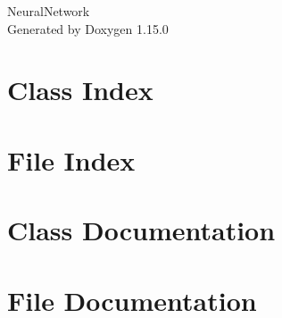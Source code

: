 \documentclass[twoside]{book}
\newcommand{\+}{\discretionary{\mbox{\scriptsize$\hookleftarrow$}}{}{}}
\newcommand{\clearemptydoublepage}{%
    \newpage{\pagestyle{empty}\cleardoublepage}%
  }
\begin{document}
  \raggedbottom
    \hypersetup{pageanchor=false,
                bookmarksnumbered=true,
                pdfencoding=unicode
               }
  \begin{titlepage}
  \vspace*{7cm}
  \begin{center}%
  {\Large Neural\+Network}\\
  \vspace*{1cm}
  {\large Generated by Doxygen 1.15.0}\\
  \end{center}
  \end{titlepage}
  \clearemptydoublepage
  \tableofcontents
  \clearemptydoublepage
  \hypersetup{pageanchor=true}
\chapter{Class Index}

\chapter{File Index}

\chapter{Class Documentation}






\chapter{File Documentation}













  \backmatter
  \newpage
  \clearemptydoublepage
  \printindex
\end{document}
